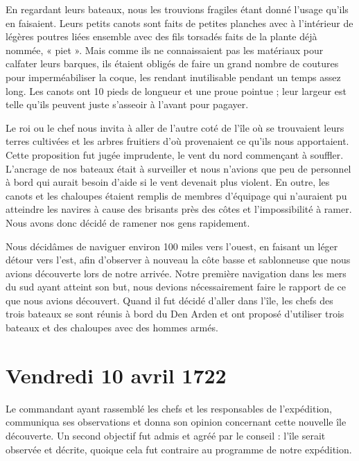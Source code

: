 \documentclass{article}
\begin{document}
        
    En regardant leurs bateaux, nous les trouvions fragiles étant donné l'usage qu'ils en faisaient. Leurs petits canots sont faits de petites planches avec à l'intérieur de légères poutres liées ensemble avec des fils torsadés faits de la plante déjà nommée, « piet ». Mais comme ils ne connaissaient pas les matériaux pour calfater leurs barques, ils étaient obligés de faire un grand nombre de coutures pour imperméabiliser la coque, les rendant inutilisable pendant un temps assez long. Les canots ont 10 pieds de longueur et une proue pointue ; leur largeur est telle qu'ils peuvent juste s'asseoir à l'avant pour pagayer.
            
        
    Le roi ou le chef nous invita à aller de l'autre coté de l'île où se trouvaient leurs terres cultivées et les arbres fruitiers d'où provenaient ce qu'ils nous apportaient. Cette proposition fut jugée imprudente, le vent du nord commençant à souffler. L'ancrage de nos bateaux était à surveiller et nous n'avions que peu de personnel à bord qui aurait besoin d'aide si le vent devenait plus violent. En outre, les canots et les chaloupes étaient remplis de membres d'équipage qui n'auraient pu atteindre les navires à cause des brisants près des côtes et l'impossibilité à ramer. Nous avons donc décidé de ramener nos gens rapidement.
            
        
    Nous décidâmes de naviguer environ 100 miles vers l'ouest, en faisant un léger détour vers l'est, afin d'observer à nouveau la côte basse et sablonneuse que nous avions découverte lors de notre arrivée. Notre première navigation dans les mers du sud ayant atteint son but, nous devions nécessairement faire le rapport de ce que nous avions découvert. Quand il fut décidé d'aller dans l'île, les chefs des trois bateaux se sont réunis à bord du Den Arden et ont proposé d'utiliser trois bateaux et des chaloupes avec des hommes armés.
         
         
            
        \section*{Vendredi 10 avril 1722}
    
            
        
    Le commandant ayant rassemblé les chefs et les responsables de l'expédition, communiqua ses observations et donna son opinion concernant cette nouvelle île découverte. Un second objectif fut admis et agréé par le conseil : l'île serait observée et décrite, quoique cela fut contraire au programme de notre expédition.
            
\end{document}
